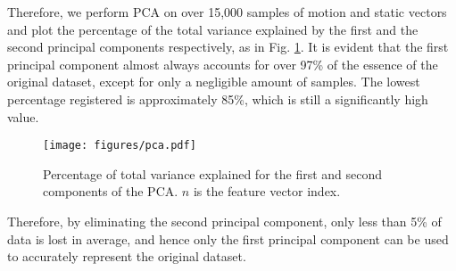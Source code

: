 Therefore, we perform PCA on over 15,000 samples of motion and static
vectors and plot the percentage of the total variance
explained by the first and the second principal components respectively, as in Fig. \ref{fi:pca}. It is evident  that the first principal component almost always accounts
for over 97\% of the essence of the original dataset, except for only a negligible amount
of samples. The lowest percentage registered is approximately 85\%, which is still a
significantly high value. 

\begin{figure}
  \centering
  \texttt{[image: figures/pca.pdf]}
  \caption{Percentage of total variance explained for the first and second components of the PCA. $n$ is the feature vector index. }\label{fi:pca}
\end{figure}


Therefore, by eliminating the second principal component, only less than 5\% of data
is lost in average, and hence only the first principal component can be used to accurately
represent the original dataset.    